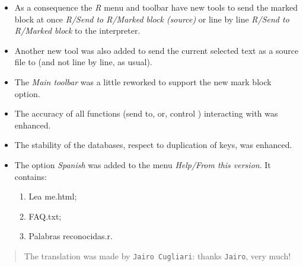 \begin{itemize}
  \item As a consequence the \textit{R} menu and toolbar have new tools
    to send the marked block at once \textit{R/Send to R/Marked block (source)}
    or line by line \textit{R/Send to R/Marked block} to the \RR{}
    interpreter.
  \item Another new tool was also added to send the current selected text
    as a source file to \RR{} (and not line by line, as usual).
  \item The \textit{Main toolbar} was a little reworked to support the
    new mark block option.
  \item The accuracy of all functions (send to, or, control \RR{} )
    interacting with \RR{} was enhanced.
  \item The stability of the databases, respect to duplication of
    keys, was enhanced.
  \item The option \textit{Spanish} was added to the menu
    \textit{Help/From this version}. It contains:
    \begin{enumerate}
      \item Lea me.html;
      \item FAQ.txt;
      \item Palabras reconocidas.r.
    \end{enumerate}
\end{itemize}

\begin{quotation}
  The translation was made by \texttt{Jairo Cugliari}: thanks \texttt{Jairo}, very much!
\end{quotation}

